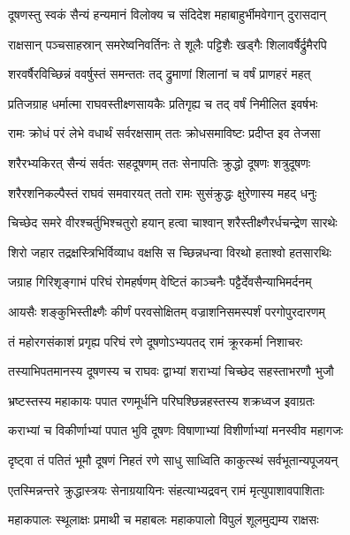 
\twolineshloka
{दूषणस्तु स्वकं सैन्यं हन्यमानं विलोक्य च}
{संदिदेश महाबाहुर्भीमवेगान् दुरासदान्} %

\twolineshloka
{राक्षसान् पञ्चसाहस्रान् समरेष्वनिवर्तिनः}
{ते शूलैः पट्टिशैः खड्गैः शिलावर्षैर्द्रुमैरपि} %

\twolineshloka
{शरवर्षैरविच्छिन्नं ववर्षुस्तं समन्ततः}
{तद् द्रुमाणां शिलानां च वर्षं प्राणहरं महत्} %

\twolineshloka
{प्रतिजग्राह धर्मात्मा राघवस्तीक्ष्णसायकैः}
{प्रतिगृह्य च तद् वर्षं निमीलित इवर्षभः} %

\twolineshloka
{रामः क्रोधं परं लेभे वधार्थं सर्वरक्षसाम्}
{ततः क्रोधसमाविष्टः प्रदीप्त इव तेजसा} %

\twolineshloka
{शरैरभ्यकिरत् सैन्यं सर्वतः सहदूषणम्}
{ततः सेनापतिः क्रुद्धो दूषणः शत्रुदूषणः} %

\twolineshloka
{शरैरशनिकल्पैस्तं राघवं समवारयत्}
{ततो रामः सुसंक्रुद्धः क्षुरेणास्य महद् धनुः} %

\twolineshloka
{चिच्छेद समरे वीरश्चर्तुभिश्चतुरो हयान्}
{हत्वा चाश्वान् शरैस्तीक्ष्णैरर्धचन्द्रेण सारथेः} %

\twolineshloka
{शिरो जहार तद्रक्षस्त्रिभिर्विव्याध वक्षसि}
{स च्छिन्नधन्वा विरथो हताश्वो हतसारथिः} %

\twolineshloka
{जग्राह गिरिशृङ्गाभं परिघं रोमहर्षणम्}
{वेष्टितं काञ्चनैः पट्टैर्देवसैन्याभिमर्दनम्} %

\twolineshloka
{आयसैः शङ्कुभिस्तीक्ष्णैः कीर्णं परवसोक्षितम्}
{वज्राशनिसमस्पर्शं परगोपुरदारणम्} %

\twolineshloka
{तं महोरगसंकाशं प्रगृह्य परिघं रणे}
{दूषणोऽभ्यपतद् रामं क्रूरकर्मा निशाचरः} %

\twolineshloka
{तस्याभिपतमानस्य दूषणस्य च राघवः}
{द्वाभ्यां शराभ्यां चिच्छेद सहस्ताभरणौ भुजौ} %

\twolineshloka
{भ्रष्टस्तस्य महाकायः पपात रणमूर्धनि}
{परिघश्छिन्नहस्तस्य शक्रध्वज इवाग्रतः} %

\twolineshloka
{कराभ्यां च विकीर्णाभ्यां पपात भुवि दूषणः}
{विषाणाभ्यां विशीर्णाभ्यां मनस्वीव महागजः} %

\twolineshloka
{दृष्ट्वा तं पतितं भूमौ दूषणं निहतं रणे}
{साधु साध्विति काकुत्स्थं सर्वभूतान्यपूजयन्} %

\twolineshloka
{एतस्मिन्नन्तरे क्रुद्धास्त्रयः सेनाग्रयायिनः}
{संहत्याभ्यद्रवन् रामं मृत्युपाशावपाशिताः} %

\twolineshloka
{महाकपालः स्थूलाक्षः प्रमाथी च महाबलः}
{महाकपालो विपुलं शूलमुद्यम्य राक्षसः} %

